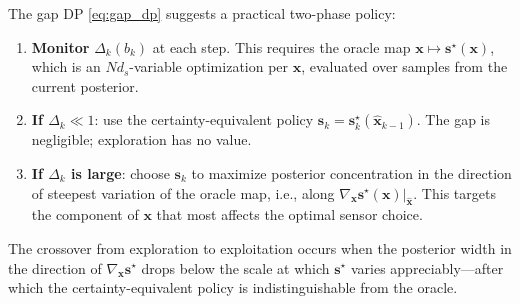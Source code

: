 \documentclass[11pt,a4paper]{article}
\begin{document}
The gap DP \eqref{eq:gap_dp} suggests a practical two-phase policy:

\begin{enumerate}[nosep]
  \item \textbf{Monitor} $\Delta_k(b_k)$ at each step.  This requires the oracle map $\bm{x} \mapsto \bm{s}^\star(\bm{x})$, which is an $N d_s$-variable optimization per $\bm{x}$, evaluated over samples from the current posterior.
  \item \textbf{If $\Delta_k \ll 1$}: use the certainty-equivalent policy $\bm{s}_k = \bm{s}_k^\star(\hat{\bm{x}}_{k-1})$.  The gap is negligible; exploration has no value.
  \item \textbf{If $\Delta_k$ is large}: choose $\bm{s}_k$ to maximize posterior concentration in the direction of steepest variation of the oracle map, i.e., along $\nabla_{\bm{x}} \bm{s}^\star(\bm{x}) \big|_{\hat{\bm{x}}}$.  This targets the component of $\bm{x}$ that most affects the optimal sensor choice.
\end{enumerate}

The crossover from exploration to exploitation occurs when the posterior width in the direction of $\nabla_{\bm{x}} \bm{s}^\star$ drops below the scale at which $\bm{s}^\star$ varies appreciably---after which the certainty-equivalent policy is indistinguishable from the oracle.
\end{document}
